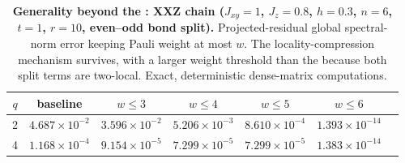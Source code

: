 \begin{table}[t]
\caption{\textbf{Generality beyond the \tfim{}: XXZ chain ($J_{xy}=1$, $J_z=0.8$, $h=0.3$, $n=6$, $t=1$, $r=10$, even--odd bond split).} Projected-residual global spectral-norm error keeping Pauli weight at most $w$. The locality-compression mechanism survives, with a larger weight threshold than the \tfim{} because both split terms are two-local. Exact, deterministic dense-matrix computations.}
\label{tab:xxz}
\centering
\begin{tabular}{ccccccc}
\toprule
$q$ & baseline & $w\le3$ & $w\le4$ & $w\le5$ & $w\le6$\\
\midrule
2 & $4.687\times10^{-2}$ & $3.596\times10^{-2}$ & $5.206\times10^{-3}$ & $8.610\times10^{-4}$ & $1.393\times10^{-14}$\\
4 & $1.168\times10^{-4}$ & $9.154\times10^{-5}$ & $7.299\times10^{-5}$ & $7.299\times10^{-5}$ & $1.383\times10^{-14}$\\
\bottomrule
\end{tabular}
\end{table}
